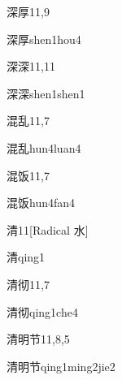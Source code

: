 \begin{entry}{深厚}{11,9}
  \begin{phonetics}{深厚}{shen1hou4}
  \end{phonetics}
\end{entry}

\begin{entry}{深深}{11,11}
  \begin{phonetics}{深深}{shen1shen1}
  \end{phonetics}
\end{entry}

\begin{entry}{混乱}{11,7}
  \begin{phonetics}{混乱}{hun4luan4}
  \end{phonetics}
\end{entry}

\begin{entry}{混饭}{11,7}
  \begin{phonetics}{混饭}{hun4fan4}
  \end{phonetics}
\end{entry}

\begin{entry}{清}{11}[Radical 水]
  \begin{phonetics}{清}{qing1}
  \end{phonetics}
\end{entry}

\begin{entry}{清彻}{11,7}
  \begin{phonetics}{清彻}{qing1che4}
  \end{phonetics}
\end{entry}

\begin{entry}{清明节}{11,8,5}
  \begin{phonetics}{清明节}{qing1ming2jie2}
  \end{phonetics}
\end{entry}

